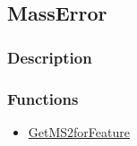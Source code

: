 \subsection{MassError}\label{MassError}
\subsubsection{Description}


\subsubsection{Functions}
\begin{itemize}
\item \hyperref[GetMS2forFeature]{GetMS2forFeature}
\end{itemize}

